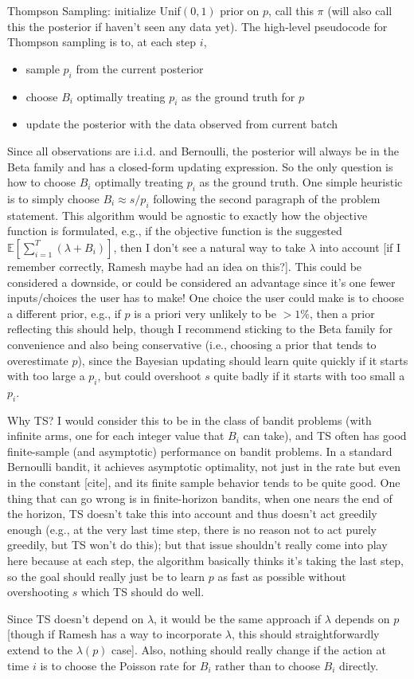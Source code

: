 \documentclass[11pt]{article}
\begin{document}
Thompson Sampling: initialize Unif$(0,1)$ prior on $p$, call this $\pi$ (will also call this the posterior if haven't seen any data yet). The high-level pseudocode for Thompson sampling is to, at each step $i$,
\begin{itemize}
    \item sample $p_i$ from the current posterior
    \item choose $B_i$ optimally treating $p_i$ as the ground truth for $p$
    \item update the posterior with the data observed from current batch
\end{itemize}
Since all observations are i.i.d. and Bernoulli, the posterior will always be in the Beta family and has a closed-form updating expression. So the only question is how to choose $B_i$ optimally treating $p_i$ as the ground truth. One simple heuristic is to simply choose $B_i\approx s/p_i$ following the second paragraph of the problem statement. This algorithm would be agnostic to exactly how the objective function is formulated, e.g., if the objective function is the suggested $\mathbb{E}[\sum_{i=1}^T(\lambda+B_i)]$, then I don't see a natural way to take $\lambda$ into account {\color{red}[if I remember correctly, Ramesh maybe had an idea on this?]}. This could be considered a downside, or could be considered an advantage since it's one fewer inputs/choices the user has to make! One choice the user could make is to choose a different prior, e.g., if $p$ is a priori very unlikely to be $>1\%$, then a prior reflecting this should help, though I recommend sticking to the Beta family for convenience and also being conservative (i.e., choosing a prior that tends to overestimate $p$), since the Bayesian updating should learn quite quickly if it starts with too large a $p_i$, but could overshoot $s$ quite badly if it starts with too small a $p_i$.

Why TS? I would consider this to be in the class of bandit problems (with infinite arms, one for each integer value that $B_i$ can take), and TS often has good finite-sample (and asymptotic) performance on bandit problems. In a standard Bernoulli bandit, it achieves asymptotic optimality, not just in the rate but even in the constant {\color{red}[cite]}, and its finite sample behavior tends to be quite good. One thing that can go wrong is in finite-horizon bandits, when one nears the end of the horizon, TS doesn't take this into account and thus doesn't act greedily enough (e.g., at the very last time step, there is no reason not to act purely greedily, but TS won't do this); but that issue shouldn't really come into play here because at each step, the algorithm basically thinks it's taking the last step, so the goal should really just be to learn $p$ as fast as possible without overshooting $s$ which TS should do well.

Since TS doesn't depend on $\lambda$, it would be the same approach if $\lambda$ depends on $p$ {\color{red}[though if Ramesh has a way to incorporate $\lambda$, this should straightforwardly extend to the $\lambda(p)$ case]}. Also, nothing should really change if the action at time $i$ is to choose the Poisson rate for $B_i$ rather than to choose $B_i$ directly.
\end{document}
